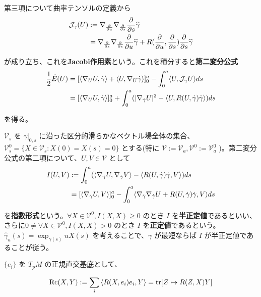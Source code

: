 \documentclass[dvipdfmx,a4paper]{jsreport}
\theoremstyle{definition}
\newcommand{\der}{\partial}
\renewcommand{\hat}{\widehat}
\begin{document}
第三項について曲率テンソルの定義から 
\begin{align*}
    \mathcal{J}_{\gamma}(U) &:=\nabla_{\der \over \der u} \nabla_{\der \over \der s}{\der \over \der s}\hat{\gamma} \\
    &=\nabla_{\der \over \der s} \nabla_{\der \over \der s}{\der \over \der u}\hat{\gamma}+R({\der \over \der u},{\der \over \der s}){\der \over \der s}\hat{\gamma}    
\end{align*}

が成り立ち、これを\textbf{Jacobi作用素}という。これを積分すると\textbf{第二変分公式}
\begin{align*}
    {1 \over 2}\ddot{E}(U) &= [\langle \nabla_{U}U,\dot{\gamma} \rangle
    +\langle U,\nabla_{U}\dot{\gamma} \rangle]_0^a
    -\int_0^a \langle U,\mathcal{J}_{\gamma} U \rangle ds \\
    &= [\langle \nabla_{U}U,\dot{\gamma} \rangle
    ]_0^a
    +\int_0^a (| \nabla_{\dot{\gamma}}U|^2-\langle U,R(U,\dot{\gamma})\dot{\gamma} \rangle) ds
\end{align*}

を得る。

$\mathcal{V}_s$ を $\gamma|_{0,s}$ に沿った区分的滑らかなベクトル場全体の集合、$\mathcal{V}^0_s=\{X\in \mathcal{V}_s \colon X(0)=X(s)=0\}$ とする(特に $\mathcal{V}:=\mathcal{V}_a,\mathcal{V}^0:=\mathcal{V}^0_a$ )。第二変分公式の第二項について、$U,V\in \mathcal{V}$ として
\begin{align*}
    I(U,V) &:=\int_0^a (\langle \nabla_{\dot{\gamma}} U, \nabla_{\dot{\gamma}} V \rangle-\langle R(U,\dot{\gamma})\dot{\gamma} ,V\rangle) ds \\
    &=[\ev{\nabla_{\dot{\gamma}}U,V}]_0^a -\int_0^a \langle \nabla_{\dot{\gamma}}\nabla_{\dot{\gamma}}U+R(U,\dot{\gamma})\dot{\gamma} ,V \rangle ds \\
\end{align*}

を\textbf{指数形式}という。$\forall X \in \mathcal{V}^0,I(X,X) \geq 0$ のとき $I$ を\textbf{半正定値}であるといい、さらに$0\neq \forall X \in \mathcal{V}^0,I(X,X) >0$ のとき $I$ を\textbf{正定値}であるという。$\hat{\gamma}_u(s)=\exp_{\gamma(s)}uX(s)$ を考えることで、$\gamma$ が最短ならば $I$ が半正定値であることが従う。

$\{e_i\}$ を $T_pM$ の正規直交基底として、

\begin{align*}
    \mbox{Rc}(X,Y):=\sum_i \ev{R(X,e_i)e_i,Y}=\tr[Z \mapsto R(Z,X)Y]
\end{align*}
\end{document}
